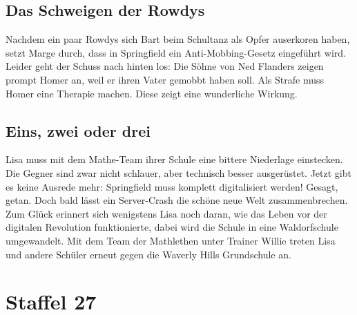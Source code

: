 
\subsection{Das Schweigen der Rowdys}\label{TABF15}
Nachdem ein paar Rowdys sich Bart beim Schultanz als Opfer auserkoren haben, setzt Marge durch, dass in Springfield ein Anti-Mobbing-Gesetz eingeführt wird. Leider geht der Schuss nach hinten los: Die Söhne von Ned Flanders zeigen prompt Homer an, weil er ihren Vater gemobbt haben soll. Als Strafe muss Homer eine Therapie machen. Diese zeigt eine wunderliche Wirkung.


\subsection{Eins, zwei oder drei}
Lisa muss mit dem Mathe-Team ihrer Schule eine bittere Niederlage einstecken. Die Gegner sind zwar nicht schlauer, aber technisch besser ausgerüstet. Jetzt gibt es keine Ausrede mehr: Springfield muss komplett digitalisiert werden! Gesagt, getan. Doch bald lässt ein Server-Crash die schöne neue Welt zusammenbrechen. Zum Glück erinnert sich wenigstens Lisa noch daran, wie das Leben vor der digitalen Revolution funktionierte, dabei wird die Schule in eine Waldorfschule umgewandelt. Mit dem Team der Mathlethen unter Trainer Willie treten Lisa und andere Schüler erneut gegen die Waverly Hills Grundschule an.


\section{Staffel 27}

